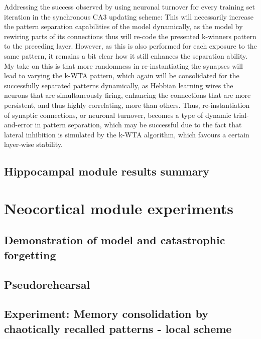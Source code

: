 Addressing the success observed by using neuronal turnover for every training set iteration in the synchronous CA3 updating scheme: 
This will necessarily increase the pattern separation capabilities of the model dynamically, as the model by rewiring parts of its connections thus will re-code the presented k-winners pattern to the preceding layer. However, as this is also performed for each exposure to the same pattern, it remains a bit clear how it still enhances the separation ability. My take on this is that more randomness in re-instantiating the synapses will lead to varying the k-WTA pattern, which again will be consolidated for the successfully separated patterns dynamically, as Hebbian learning wires the neurons that are simultaneously firing, enhancing the connections that are more persistent, and thus highly correlating, more than others. Thus, re-instantiation of synaptic connections, or neuronal turnover, becomes a type of dynamic trial-and-error in pattern separation, which may be successful due to the fact that lateral inhibition is simulated by the k-WTA algorithm, which favours a certain layer-wise stability.

\subsection{Hippocampal module results summary}




\section{Neocortical module experiments}

\subsection{Demonstration of model and catastrophic forgetting}



\subsection{Pseudorehearsal}

\citep{Ans1997}

\subsection{Experiment: Memory consolidation by chaotically recalled patterns - local scheme}

